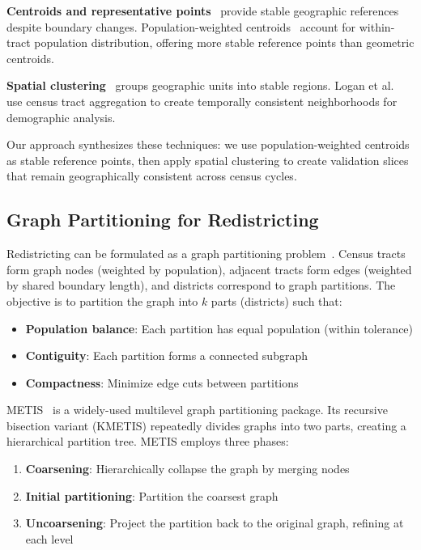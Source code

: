 \textbf{Centroids and representative points}~\cite{dent1999} provide stable geographic references despite boundary changes. Population-weighted centroids~\cite{cromley1996} account for within-tract population distribution, offering more stable reference points than geometric centroids.

\textbf{Spatial clustering}~\cite{wang2012} groups geographic units into stable regions. Logan et al.~\cite{logan2014} use census tract aggregation to create temporally consistent neighborhoods for demographic analysis.

Our approach synthesizes these techniques: we use population-weighted centroids as stable reference points, then apply spatial clustering to create validation slices that remain geographically consistent across census cycles.

\subsection{Graph Partitioning for Redistricting}

Redistricting can be formulated as a graph partitioning problem~\cite{hess1965}. Census tracts form graph nodes (weighted by population), adjacent tracts form edges (weighted by shared boundary length), and districts correspond to graph partitions. The objective is to partition the graph into $k$ parts (districts) such that:
\begin{itemize}
    \item \textbf{Population balance}: Each partition has equal population (within tolerance)
    \item \textbf{Contiguity}: Each partition forms a connected subgraph
    \item \textbf{Compactness}: Minimize edge cuts between partitions
\end{itemize}

METIS~\cite{karypis1998} is a widely-used multilevel graph partitioning package. Its recursive bisection variant (KMETIS) repeatedly divides graphs into two parts, creating a hierarchical partition tree. METIS employs three phases:
\begin{enumerate}
    \item \textbf{Coarsening}: Hierarchically collapse the graph by merging nodes
    \item \textbf{Initial partitioning}: Partition the coarsest graph
    \item \textbf{Uncoarsening}: Project the partition back to the original graph, refining at each level
\end{enumerate}

